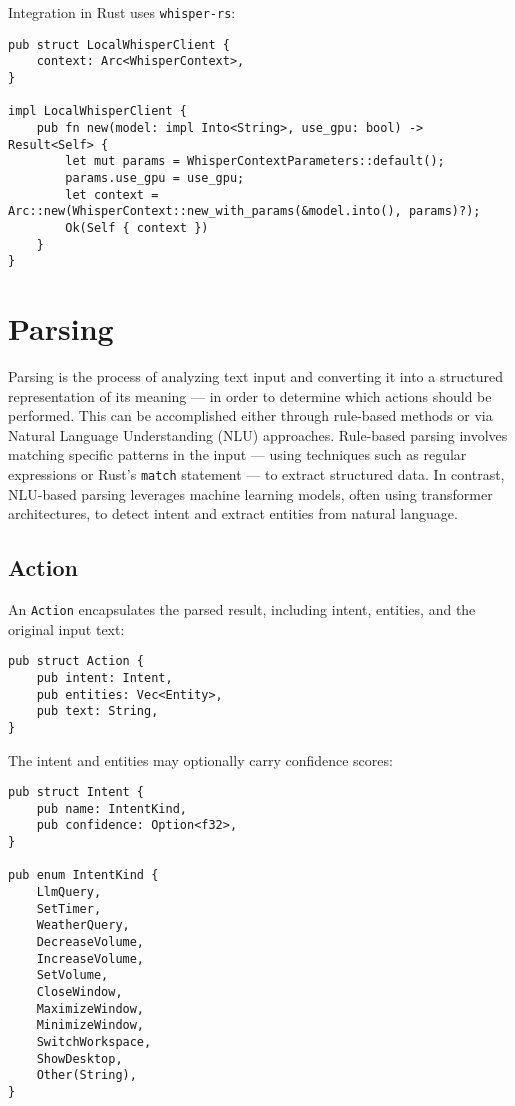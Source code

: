Integration in Rust uses \texttt{whisper-rs}:

\begin{verbatim}
pub struct LocalWhisperClient {
    context: Arc<WhisperContext>,
}

impl LocalWhisperClient {
    pub fn new(model: impl Into<String>, use_gpu: bool) -> Result<Self> {
        let mut params = WhisperContextParameters::default();
        params.use_gpu = use_gpu;
        let context = Arc::new(WhisperContext::new_with_params(&model.into(), params)?);
        Ok(Self { context })
    }
}
\end{verbatim}

\section{Parsing}
Parsing is the process of analyzing text input and converting it
into a structured representation of its meaning --- in order to determine which actions should be performed.
This can be accomplished either through rule-based methods
or via Natural Language Understanding (NLU) approaches.
Rule-based parsing involves matching specific patterns in the input ---
using techniques such as regular expressions or Rust's \texttt{match} statement ---
to extract structured data.
In contrast, NLU-based parsing leverages machine learning models,
often using transformer architectures, to detect intent and extract entities from natural language.

\subsection{Action}
An \texttt{Action} encapsulates the parsed result, including intent, entities, and the original input text:

\begin{verbatim}
pub struct Action {
    pub intent: Intent,
    pub entities: Vec<Entity>,
    pub text: String,
}
\end{verbatim}

The intent and entities may optionally carry confidence scores:

\begin{verbatim}
pub struct Intent {
    pub name: IntentKind,
    pub confidence: Option<f32>,
}

pub enum IntentKind {
    LlmQuery,
    SetTimer,
    WeatherQuery,
    DecreaseVolume,
    IncreaseVolume,
    SetVolume,
    CloseWindow,
    MaximizeWindow,
    MinimizeWindow,
    SwitchWorkspace,
    ShowDesktop,
    Other(String),
}
\end{verbatim}

